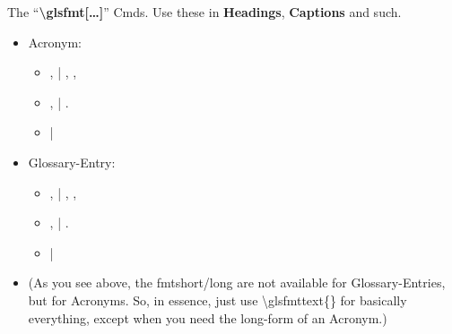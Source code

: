\npi
The \enquote{\bfseries\textbackslash glsfmt[\ldots]} Cmds. Use these in \textbf{Headings}, \textbf{Captions} and such.
\nl
\begin{itemize}
	\item Acronym:
		\begin{itemize}
			\item {},  | , ,
			\item {},  | .
			\item {} | 
		\end{itemize}
	\item Glossary-Entry:
		\begin{itemize}
			\item {},  | , ,
			\item {},  | .
			\item {} | 
		\end{itemize}
\end{itemize}
\begin{itemize}[labpragA]
	\item (As you see above, the fmtshort/long are not available for Glossary-Entries, but for Acronyms. So, in essence, just use \textbackslash glsfmttext\{\} for basically everything, except when you need the long-form of an Acronym.)
\end{itemize}






